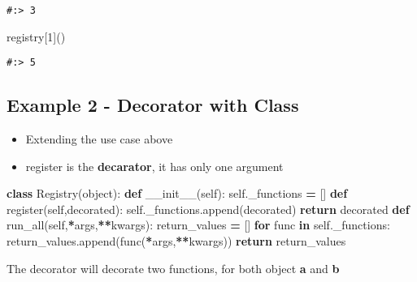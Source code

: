 \documentclass[
]{book}
\newenvironment{Shaded}{\begin{snugshade}}{\end{snugshade}}
\newcommand{\BuiltInTok}[1]{#1}
\newcommand{\ControlFlowTok}[1]{\textcolor[rgb]{0.27,0.27,0.27}{\textbf{#1}}}
\newcommand{\DecValTok}[1]{\textcolor[rgb]{0.06,0.06,0.06}{#1}}
\newcommand{\FunctionTok}[1]{\textcolor[rgb]{0,0,0}{#1}}
\newcommand{\KeywordTok}[1]{\textcolor[rgb]{0.27,0.27,0.27}{\textbf{#1}}}
\newcommand{\NormalTok}[1]{#1}
\newcommand{\OperatorTok}[1]{\textcolor[rgb]{0.43,0.43,0.43}{\textbf{#1}}}
\newcommand{\VariableTok}[1]{\textcolor[rgb]{0,0,0}{#1}}
\providecommand{\tightlist}{%
  \setlength{\itemsep}{0pt}\setlength{\parskip}{0pt}}
\begin{document}
\begin{verbatim}
#:> 3
\end{verbatim}

\begin{Shaded}
\begin{Highlighting}[]
\NormalTok{registry[}\DecValTok{1}\NormalTok{]()}
\end{Highlighting}
\end{Shaded}

\begin{verbatim}
#:> 5
\end{verbatim}

\hypertarget{example-2---decorator-with-class}{%
\subsection{Example 2 - Decorator with Class}\label{example-2---decorator-with-class}}

\begin{itemize}
\tightlist
\item
  Extending the use case above
\item
  register is the \textbf{decarator}, it has only one argument
\end{itemize}

\begin{Shaded}
\begin{Highlighting}[]
\KeywordTok{class}\NormalTok{ Registry(}\BuiltInTok{object}\NormalTok{):}
    \KeywordTok{def} \FunctionTok{\_\_init\_\_}\NormalTok{(}\VariableTok{self}\NormalTok{):}
        \VariableTok{self}\NormalTok{.\_functions }\OperatorTok{=}\NormalTok{ []}
    \KeywordTok{def}\NormalTok{ register(}\VariableTok{self}\NormalTok{,decorated):}
        \VariableTok{self}\NormalTok{.\_functions.append(decorated)}
        \ControlFlowTok{return}\NormalTok{ decorated}
    \KeywordTok{def}\NormalTok{ run\_all(}\VariableTok{self}\NormalTok{,}\OperatorTok{*}\NormalTok{args,}\OperatorTok{**}\NormalTok{kwargs):}
\NormalTok{        return\_values }\OperatorTok{=}\NormalTok{ []}
        \ControlFlowTok{for}\NormalTok{ func }\KeywordTok{in} \VariableTok{self}\NormalTok{.\_functions:}
\NormalTok{            return\_values.append(func(}\OperatorTok{*}\NormalTok{args,}\OperatorTok{**}\NormalTok{kwargs))}
        \ControlFlowTok{return}\NormalTok{ return\_values}
\end{Highlighting}
\end{Shaded}

The decorator will decorate two functions, for both object \textbf{a} and \textbf{b}
\end{document}
